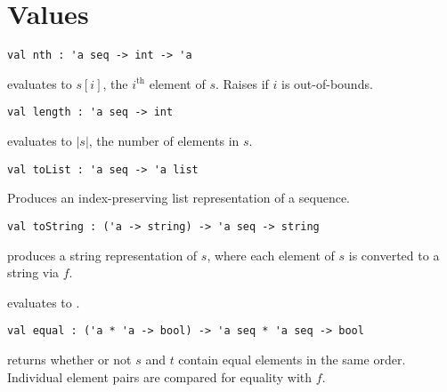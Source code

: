 \section{Values}

\begin{gram}[nth]
\label{gr:nth}
\begin{verbatim}
val nth : 'a seq -> int -> 'a
\end{verbatim}
 evaluates to $s[i]$, the $i^\text{th}$ element of $s$.
Raises  if $i$ is out-of-bounds.
\end{gram}

\begin{gram}[length]
\label{gr:length}
\begin{verbatim}
val length : 'a seq -> int
\end{verbatim}
 evaluates to $|s|$, the number of elements in $s$.
\end{gram}

\begin{gram}[toList]
\label{gr:toList}
\begin{verbatim}
val toList : 'a seq -> 'a list
\end{verbatim}
Produces an index-preserving list representation of a sequence.
\end{gram}

\begin{group}
\begin{gram}[toString]
\label{gr:toString}
\begin{verbatim}
val toString : ('a -> string) -> 'a seq -> string
\end{verbatim}
 produces a string representation of $s$, where each
element of $s$ is converted to a string via $f$.
\end{gram}
\begin{example}
 evaluates to .
\end{example}
\end{group}

\begin{gram}[equal]
\label{gr:equal}
\begin{verbatim}
val equal : ('a * 'a -> bool) -> 'a seq * 'a seq -> bool
\end{verbatim}
 returns whether or not $s$ and $t$ contain equal elements
in the same order. Individual element pairs are compared for equality with $f$.
\end{gram}


